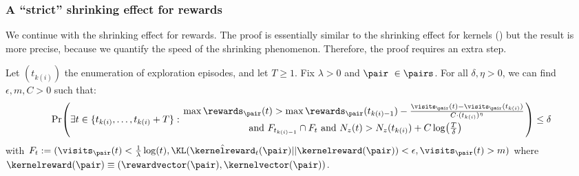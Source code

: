 \documentclass[preprint,cleveref,12pt]{colt2025}
\DeclarePairedDelimiter{\braces}{\{}{\}}	%
\DeclarePairedDelimiter{\parens}{(}{)}	%
\def\kernel{\kernelvector}
\def\kerrew{\kernelreward}
\def\reward{\rewardvector}
\begin{document}
    \subsubsection{A ``strict'' shrinking effect for rewards}

    We continue with the shrinking effect for rewards.
    The proof is essentially similar to the shrinking effect for kernels () but the result is more precise, because we quantify the speed of the shrinking phenomenon.
    Therefore, the proof requires an extra step. 

    \begin{lemma}
    \label{lemma_shrinking_rewards}
        Let $(t_{k(i)})$ the enumeration of exploration episodes, and let $T \ge 1$.
        Fix $\lambda > 0$ and $\pair \in \pairs$.
        For all $\delta, \eta > 0$, we can find $\epsilon, m, C > 0$ such that:
        \begin{equation*}
        \begin{gathered}
            \Pr \parens*{
                \exists t \in \braces{t_{k(i)}, \ldots, t_{k(i)}+T}
                :
                {
                    \max \rewards_\pair(t) > \max \rewards_\pair(t_{k(i)-1}) - \tfrac{\visits_\pair(t) - \visits_\pair(t_{k(i)})}{C \cdot (t_{k(i)})^\eta}
                    \atop
                    \text{~and~} F_{t_{k(i)-1}} \cap F_t \text{~and~}
                    N_z(t) > N_z(t_{k(i)}) + C \log\parens*{\tfrac T\delta}
                }
            }
            \le \delta
        \end{gathered}
        \end{equation*}
        with $F_{t} := (\visits_\pair(t) < \frac 1\lambda \log(t), \KL(\hat{\kerrew}_t(\pair)||\kerrew(\pair)) < \epsilon, \visits_\pair(t) > m)$ where $\kerrew(\pair) \equiv (\reward(\pair), \kernel(\pair))$. 
    \end{lemma}
\end{document}
